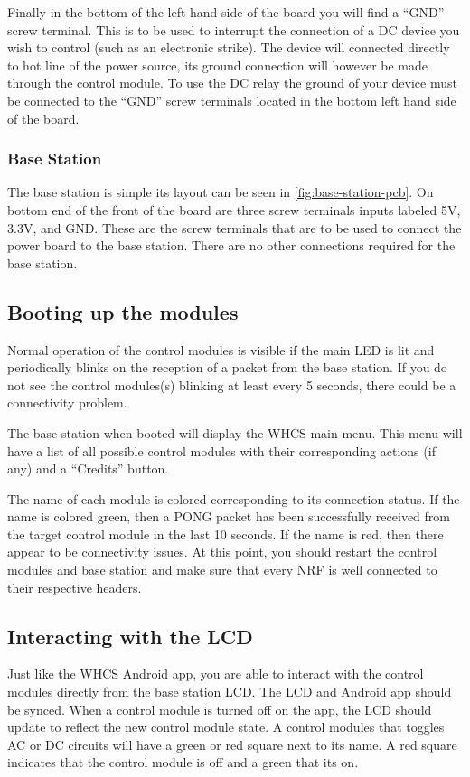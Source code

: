 Finally in the bottom of the left hand side of the board you will find a “GND”
screw terminal. This is to be used to interrupt the connection of a DC device
you wish to control (such as an electronic strike). The device will connected
directly to hot line of the power source, its ground connection will however be
made through the control module. To use the DC relay the ground of your device
must be connected to the “GND” screw terminals located in the bottom left hand
side of the board.

\subsubsection{Base Station}
The base station is simple its layout can be seen in \autoref{fig:base-station-pcb}.  On bottom
end of the front of the board are three screw terminals inputs labeled 5V,
3.3V, and GND. These are the screw terminals that are to be used to connect the
power board to the base station. There are no other connections required for
the base station.


\subsection{Booting up the modules}
Normal operation of the control modules is visible if the main LED is lit and periodically blinks
on the reception of a packet from the base station. If you do not see the control modules(s)
blinking at least every 5 seconds, there could be a connectivity problem.

The base station when booted will display the WHCS main menu. This menu will have a list of
all possible control modules with their corresponding actions (if any) and a ``Credits'' button.

The name of each module is colored corresponding to its connection status. If the name 
is colored green, then a PONG packet has been successfully received from the target
control module in the last 10 seconds. If the name is red, then there appear to be
connectivity issues. At this point, you should restart the control modules and base station
and make sure that every NRF is well connected to their respective headers.

\subsection{Interacting with the LCD}
Just like the WHCS Android app, you are able to interact with the control modules directly
from the base station LCD. The LCD and Android app should be synced. When a control module
is turned off on the app, the LCD should update to reflect the new control module state.
A control modules that toggles AC or DC circuits will have a green or red square next to
its name. A red square indicates that the control module is off and a green that its on.

